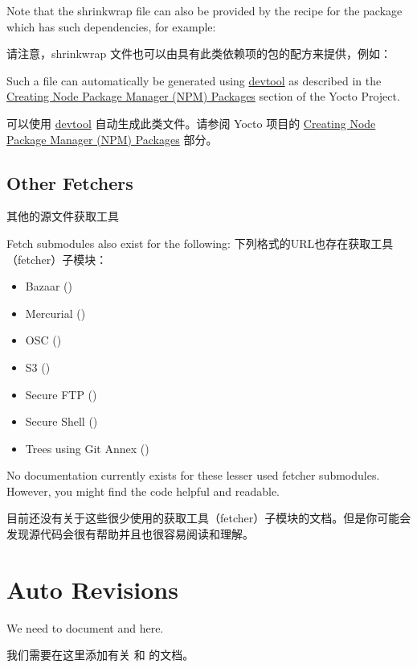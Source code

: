 Note that the shrinkwrap file can also be provided by the recipe for the package which has such dependencies, for example:

请注意，shrinkwrap 文件也可以由具有此类依赖项的包的配方来提供，例如：


Such a file can automatically be generated using \href{https://docs.yoctoproject.org/ref-manual/devtool-reference.html}{devtool} as described in the \href{https://docs.yoctoproject.org/dev-manual/packages.html#creating-node-package-manager-npm-packages}{Creating Node Package Manager (NPM) Packages} section of the Yocto Project.

可以使用 \href{https://docs.yoctoproject.org/ref-manual/devtool-reference.html}{devtool} 自动生成此类文件。请参阅 Yocto 项目的 \href{https://docs.yoctoproject.org/dev-manual/packages.html#creating-node-package-manager-npm-packages}{Creating Node Package Manager (NPM) Packages} 部分。

\subsection{Other Fetchers}{其他的源文件获取工具}
\label{section:Other Fetchers}

Fetch submodules also exist for the following:
下列格式的URL也存在获取工具（fetcher）子模块：

\begin{itemize}
\setlength\itemsep{1.0em}
\item Bazaar ()

\item Mercurial ()

\item OSC ()

\item S3 ()

\item Secure FTP ()

\item Secure Shell ()

\item Trees using Git Annex ()
\end{itemize}

No documentation currently exists for these lesser used fetcher submodules. However, you might find the code helpful and readable.

目前还没有关于这些很少使用的获取工具（fetcher）子模块的文档。但是你可能会发现源代码会很有帮助并且也很容易阅读和理解。

\section{Auto Revisions}

We need to document  and  here.

我们需要在这里添加有关  和  的文档。
